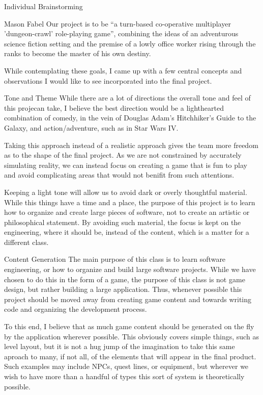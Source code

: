 \documentclass[12pt]{report}
\begin{document}
\begin{section}{Individual Brainstorming}

\begin{subsection}{Mason Fabel}
Our project is to be ``a turn-based co-operative multiplayer
'dungeon-crawl' role-playing game'', combining the ideas of an adventurous
science fiction setting and the premise of a lowly office worker rising
through the ranks to become the master of his own destiny.

While contemplating these goals, I came up with a few central concepts and
observations I would like to see incorporated into the final project.

\begin{subsubsection}{Tone and Theme}
While there are a lot of directions the overall tone and feel of this
projecan take, I believe the best direction would be a lighthearted
combination of comedy, in the vein of Douglas Adam's Hitchhiker's Guide to
the Galaxy, and action/adventure, such as in Star Wars IV.

Taking this approach instead of a realistic approach gives the team more
freedom as to the shape of the final project. As we are not constrained by
accurately simulating reality, we can instead focus on creating a game that
is fun to play and avoid complicating areas that would not benifit from
such attentions.

Keeping a light tone will allow us to avoid dark or overly thoughtful
material. While this things have a time and a place, the purpose
of this project is to learn how to organize and create large pieces of
software, not to create an artistic or philosophical statement. By avoiding
such material, the focus is kept on the engineering, where it should be,
instead of the content, which is a matter for a different class.
\end{subsubsection}

\begin{subsubsection}{Content Generation}
The main purpose of this class is to learn software engineering, or how
to organize and build large software projects. While we have chosen to do
this in the form of a game, the purpose of this class is not game design,
but rather building a large application. Thus, whenever possible this
project should be moved away from creating game content and towards writing
code and organizing the development process.

To this end, I believe that as much game content should be generated on the
fly by the application wherever possible. This obviously covers simple
things, such as level layout, but it is not a hug jump of the imagination
to take this same aproach to many, if not all, of the elements that will
appear in the final product. Such examples may include NPCs, quest lines, or
equipment, but wherever we wish to have more than a handful of types this
sort of system is theoretically possible.


\end{subsubsection}
\end{subsection}
\end{section}
\end{document}

